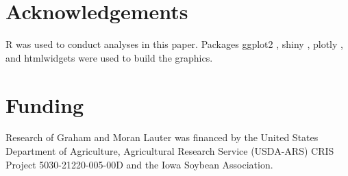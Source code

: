 \documentclass{bioinfo}
\begin{document}
\section*{Acknowledgements}

R \citep{R} was used to conduct analyses in this paper. Packages ggplot2 \citep{ggplot2}, shiny \citep{shiny}, plotly \citep{plotly}, and htmlwidgets were used to build the graphics. 

\section*{Funding}

Research of Graham and Moran Lauter was financed by the United States Department of Agriculture, Agricultural Research Service (USDA-ARS) CRIS Project 5030-21220-005-00D and the Iowa Soybean Association.
\end{document}
